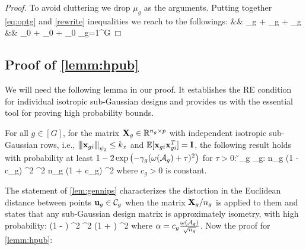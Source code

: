 \begin{proof}
	To avoid cluttering we drop $\mu_g$ as the arguments.
	Putting together \cref{eq:optg} and \cref{rewrite} inequalities we reach to the followings: 
	\be 
	\nr 
	 &\leq&   \rho_g   +  \xi_g  + \phi_g  
	\\ \nr 
	 &\leq& \rho_0  + \xi_0  + \mu_0 \sum_{g=1}^{G}     
	\ee 
\end{proof}

\subsection{Proof of \cref{lemm:hpub}}
We will need the following lemma in our proof. 
It establishes the RE condition for individual isotropic sub-Gaussian designs and provides us with the essential tool for proving high probability bounds.  
\begin{lemma}
	\label{lem:gennips}
	For all $g \in [G]$, for the matrix $\mathbf{X}_g \in \mathbb R^{n_g \times p}$ with independent isotropic sub-Gaussian rows, i.e., ${\left\vert\kern-0.25ex\left\vert\kern-0.25ex\left\vert \mathbf{x}_{gi} \right\vert\kern-0.25ex\right\vert\kern-0.25ex\right\vert}_{\psi_2} \leq k_x$ and $\mathbb{E}[\mathbf{x}_{gi} \mathbf{x}_{gi}^T] = \mathbf{I}$, the following result holds with probability at least $1 - 2\exp\left( -\gamma_g (\omega(\cA_g) + \tau)^2  \right)$ for $\tau > 0$:
	\be 
	\nr 
	\forall \u_g \in \cC_g: n_g \left(1 -  c_g\right) ^2  \leq {}^2 \leq n_g \left(1 +  c_g\right) ^2
	\ee 
	where $c_g > 0$ is constant.%
\end{lemma} 

The statement of \cref{lem:gennips} characterizes the distortion in the Euclidean distance between points $\u_g \in \cC_g$ when the matrix $\mathbf{X}_g/n_g$ is applied to them and states that any sub-Gaussian design matrix is approximately isometry, with high probability:
\be 
\nr 
(1 -  \alpha) ^2 \leq {}^2 \leq (1 + \alpha) ^2
\ee 
where $\alpha = c_g \frac{\omega(\cA_g)}{\sqrt{n_g}}$.
Now the proof for \cref{lemm:hpub}: 
